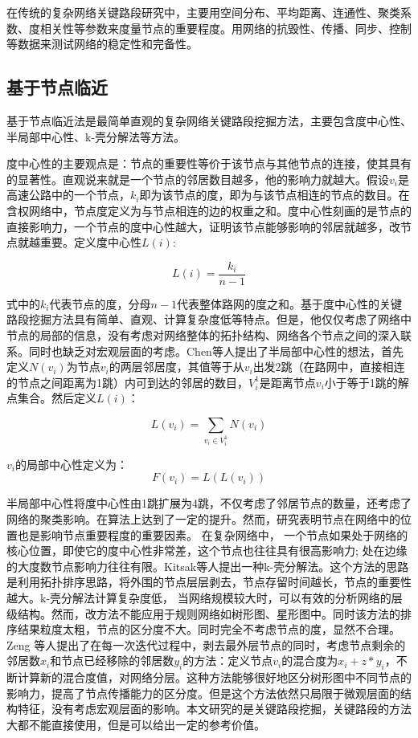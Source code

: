 	在传统的复杂网络关键路段研究中，主要用空间分布、平均距离、连通性、聚类系数、度相关性等参数来度量节点的重要程度。用网络的抗毁性、传播、同步、控制等数据来测试网络的稳定性和完备性。
				
	\subsection{基于节点临近}
		基于节点临近法是最简单直观的复杂网络关键路段挖掘方法，主要包含度中心性、半局部中心性、k-壳分解法等方法。

		度中心性的主要观点是：节点的重要性等价于该节点与其他节点的连接，使其具有的显著性。直观说来就是一个节点的邻居数目越多，他的影响力就越大\parencite{Phillip1972Factoring}。假设$v_i$是高速公路中的一个节点，$k_i$即为该节点的度，即为与该节点相连的节点的数目。在含权网络中，节点度定义为与节点相连的边的权重之和。度中心性刻画的是节点的直接影响力，一个节点的度中心性越大，证明该节点能够影响的邻居就越多，改节点就越重要。定义度中心性$L(i)$:

		$$L(i)=\frac{k_i}{n-1}$$

		式中的$k_i$代表节点的度，分母$n-1$代表整体路网的度之和。基于度中心性的关键路段挖掘方法具有简单、直观、计算复杂度低等特点。但是，他仅仅考虑了网络中节点的局部的信息，没有考虑对网络整体的拓扑结构、网络各个节点之间的深入联系。同时也缺乏对宏观层面的考虑。Chen等人提出了半局部中心性的想法\parencite{Chen2012Identifying}，首先定义$N(v_i)$为节点$v_i$的两层邻居度，其值等于从$v_i$出发2跳（在路网中，直接相连的节点之间距离为1跳）内可到达的邻居的数目，$V_i^1$是距离节点$v_i$小于等于1跳的解点集合。然后定义$L(i)$：

		$$L(v_i)=\sum\limits_{v_i \in V_i^1} N(v_i)$$

		$v_i$的局部中心性定义为：
			$$F(v_i)=L(L(v_i))$$

		半局部中心性将度中心性由1跳扩展为4跳，不仅考虑了邻居节点的数量，还考虑了网络的聚类影响。在算法上达到了一定的提升。然而，研究表明节点在网络中的位置也是影响节点重要程度的重要因素。 在复杂网络中， 一个节点如果处于网络的核心位置，即使它的度中心性非常差，这个节点也往往具有很高影响力; 处在边缘的大度数节点影响力往往有限。Kitsak等人提出一种k-壳分解法\parencite{Kitsak2010Identification}。这个方法的思路是利用拓扑排序思路，将外围的节点层层剥去，节点存留时间越长，节点的重要性越大。k-壳分解法计算复杂度低， 当网络规模较大时，可以有效的分析网络的层级结构。然而，改方法不能应用于规则网络如树形图、星形图中。同时该方法的排序结果粒度太粗，节点的区分度不大。同时完全不考虑节点的度，显然不合理。Zeng 等人提出了在每一次迭代过程中，剥去最外层节点的同时，考虑节点剩余的邻居数$x_i$和节点已经移除的邻居数$y_i$的方法\parencite{Zeng2012Ranking}：定义节点$v_i$的混合度为$x_i+z*y_i$，不断计算新的混合度值，对网络分层。这种方法能够很好地区分树形图中不同节点的影响力，提高了节点传播能力的区分度。但是这个方法依然只局限于微观层面的结构特征，没有考虑宏观层面的影响。本文研究的是关键路段挖掘，关键路段的方法大都不能直接使用，但是可以给出一定的参考价值。
			

